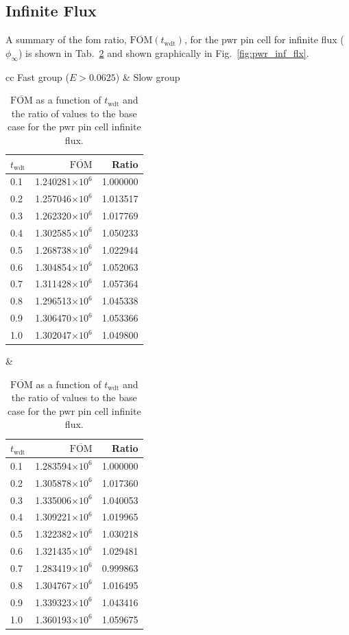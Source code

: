 \subsection{Infinite Flux}
A summary of the \gls{fom} ratio,
$\overline{\mathrm{FOM}}(t_{\mathrm{wdt}})$, for the \gls{pwr} pin
cell for infinite flux ($\phi_{\infty}$) is shown in Tab.~\ref{tab:pwr_inf_flx} and
shown graphically in Fig.~\ref{fig:pwr_inf_flx}.
\begin{table}[hbtp]
  \centering
  \caption[$\overline{\mathrm{FOM}}$ and ratio for
    the \acrshort{pwr} pin cell infinite flux.]{$\overline{\mathrm{FOM}}$ as a function of
    $t_{\mathrm{wdt}}$ and the ratio of values to the base case for
    the \gls{pwr} pin cell infinite flux.}
  \begin{tabular}{cc} Fast group ($E > 0.0625$) & Slow group \\
\begin{tabular}{lrr}
\toprule
$t_{\mathrm{wdt}}$ &                   $\overline{\mathrm{FOM}}$ & Ratio\\
\midrule
 0.1 & 1.240281$\times 10^{6}$ & 1.000000 \\
 0.2 & 1.257046$\times 10^{6}$ & 1.013517 \\
 0.3 & 1.262320$\times 10^{6}$ & 1.017769 \\
 0.4 & 1.302585$\times 10^{6}$ & 1.050233 \\
 0.5 & 1.268738$\times 10^{6}$ & 1.022944 \\
 0.6 & 1.304854$\times 10^{6}$ & 1.052063 \\
 0.7 & 1.311428$\times 10^{6}$ & 1.057364 \\
 0.8 & 1.296513$\times 10^{6}$ & 1.045338 \\
 0.9 & 1.306470$\times 10^{6}$ & 1.053366 \\
 1.0 & 1.302047$\times 10^{6}$ & 1.049800 \\
\bottomrule
\end{tabular} &
\begin{tabular}{lrr}
\toprule
$t_{\mathrm{wdt}}$ &                   $\overline{\mathrm{FOM}}$ &
                                                                   Ratio\\
\midrule
 0.1 & 1.283594$\times 10^{6}$ & 1.000000 \\
 0.2 & 1.305878$\times 10^{6}$ & 1.017360 \\
 0.3 & 1.335006$\times 10^{6}$ & 1.040053 \\
 0.4 & 1.309221$\times 10^{6}$ & 1.019965 \\
 0.5 & 1.322382$\times 10^{6}$ & 1.030218 \\
 0.6 & 1.321435$\times 10^{6}$ & 1.029481 \\
 0.7 & 1.283419$\times 10^{6}$ & 0.999863 \\
 0.8 & 1.304767$\times 10^{6}$ & 1.016495 \\
 0.9 & 1.339323$\times 10^{6}$ & 1.043416 \\
 1.0 & 1.360193$\times 10^{6}$ & 1.059675 \\
\bottomrule
\end{tabular}
  \end{tabular}

  \label{tab:pwr_inf_flx}
\end{table}
